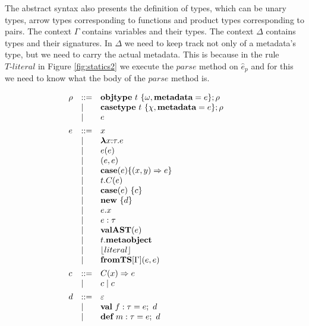 The abstract syntax also presents the definition of types, which can be unary types, arrow types corresponding to functions and product types corresponding to pairs. The context $\Gamma$ contains variables and their types. The context $\Delta$ contains types and their signatures. In $\Delta$ we need to keep track not only of a metadata's type, but we need to carry the actual metadata. This is because in the rule $\textit{T-literal}$ in Figure \ref{fig:statics2} we execute the $parse$ method on $\hat{e}_p$ and for this we need to know what the body of the $parse$ method is.




\begin{figure}
\centering
\[
\begin{array}[t]{lll} 
\rho & \bnfdef & \keyw{objtype}~ t~ \{ \omega, \keyw{metadata}=e \}; \rho \\
     & \bnfalt & \keyw{casetype}~ t~ \{ \chi, \keyw{metadata}=e \}; \rho\\
     & \bnfalt & e
     \\[1ex]
e    & \bnfdef & x \\
     & \bnfalt & \boldsymbol\lambda x{:}\tau . e \\ %
     & \bnfalt & e(e) \\
     & \bnfalt & (e, e) \\
     & \bnfalt & \keyw{case}(e) \{(x, y) \Rightarrow e\}\\
     & \bnfalt & t.C(e) \\
     & \bnfalt & \keyw{case}(e)~\{ c \} \\
     & \bnfalt & \keyw{new}~ \{ d \}\\
     & \bnfalt & e.x \\
     & \bnfalt & e : \tau\\
     & \bnfalt & \keyw{valAST}(e) \\
     & \bnfalt & t.\keyw{metaobject}\\
     & \bnfalt & \lfloor literal \rfloor \\
     & \bnfalt & \keyw{fromTS}[\Gamma](e, e)
\\[1ex]	
c    & \bnfdef & C(x) \Rightarrow e\\
     & \bnfalt & c \bnfalt c
	 \\[1ex]
d   & \bnfdef & \varepsilon \\
     & \bnfalt & \keyw{val}~ f:\tau = e;~d \\
     & \bnfalt & \keyw{def}~ m:\tau = e;~d
\\[1ex] 
\end{array}
\begin{array}[t]{lll}
~~~
\end{array}
\begin{array}[t]{lll}



\end{array}\]
\end{figure}
